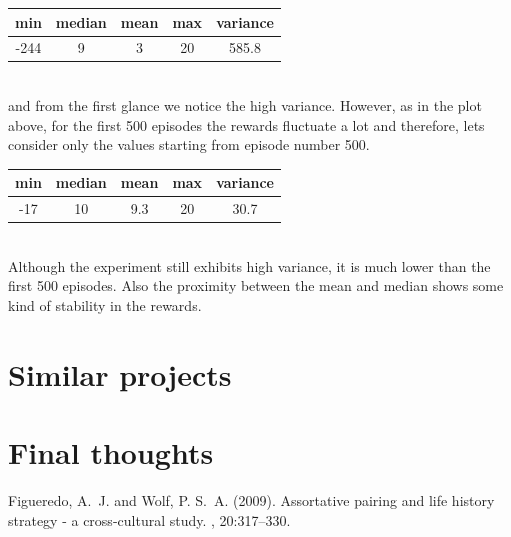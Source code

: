 \documentclass[twoside,twocolumn]{article}
\begin{document}
\begin{tabular}{c|c|c|c|c}
 min & median & mean & max & variance \\
 \hline
 -244 & 9 & 3 & 20 & 585.8
 \end{tabular} \\
and from the first glance we notice the high variance. However, as in the plot above, for the first 500 episodes the rewards fluctuate a lot and therefore, lets consider only the values starting from episode number 500.\\

\begin{tabular}{c|c|c|c|c}
 min & median & mean & max & variance \\
 \hline
 -17 & 10 & 9.3 & 20 & 30.7 
 \end{tabular} \\

Although the experiment still exhibits  high variance, it is much lower than the first 500 episodes. Also the proximity between the mean and median shows some kind of stability in the rewards.

\section{Similar projects}
\section{Final thoughts}


\begin{thebibliography}{99} %

Figueredo, A.~J. and Wolf, P. S.~A. (2009).
\newblock Assortative pairing and life history strategy - a cross-cultural
  study.
, 20:317--330.
 
\end{thebibliography}

\end{document}
